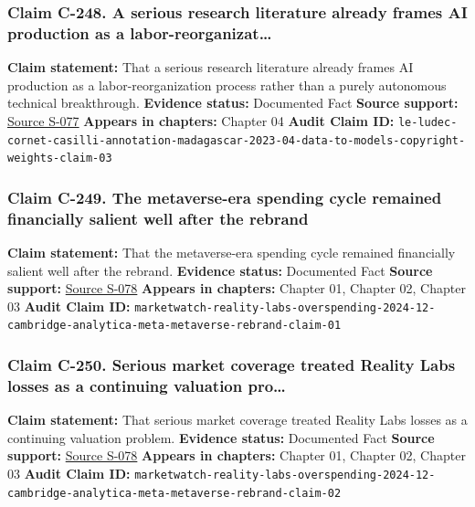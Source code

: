 \documentclass[
  american,
  11pt,
  letterpaper,
]{article}
\begin{document}
\subsubsection{Claim C-248. A serious research literature already frames
AI production as a
labor-reorganizat\ldots{}}\label{claim-c-248-a-serious-research-literature-already-frames-ai-production-as-a-labor-reorganizat}

\textbf{Claim statement:} That a serious research literature already
frames AI production as a labor-reorganization process rather than a
purely autonomous technical breakthrough. \textbf{Evidence status:}
Documented Fact \textbf{Source support:}
\hyperref[source-s-077-the-problem-with-annotation-human-labour-and-outsourcing-between-france-and-madagascar]{Source
S-077} \textbf{Appears in chapters:} Chapter 04 \textbf{Audit Claim ID:}
\texttt{le-ludec-cornet-casilli-annotation-madagascar-2023-04-data-to-models-copyright-weights-claim-03}

\subsubsection{Claim C-249. The metaverse-era spending cycle remained
financially salient well after the
rebrand}\label{claim-c-249-the-metaverse-era-spending-cycle-remained-financially-salient-well-after-the-rebrand}

\textbf{Claim statement:} That the metaverse-era spending cycle remained
financially salient well after the rebrand. \textbf{Evidence status:}
Documented Fact \textbf{Source support:}
\hyperref[source-s-078-with-reality-labs-meta-risks-heading-down-slippery-slope-of-overspending-again]{Source
S-078} \textbf{Appears in chapters:} Chapter 01, Chapter 02, Chapter 03
\textbf{Audit Claim ID:}
\texttt{marketwatch-reality-labs-overspending-2024-12-cambridge-analytica-meta-metaverse-rebrand-claim-01}

\subsubsection{Claim C-250. Serious market coverage treated Reality Labs
losses as a continuing valuation
pro\ldots{}}\label{claim-c-250-serious-market-coverage-treated-reality-labs-losses-as-a-continuing-valuation-pro}

\textbf{Claim statement:} That serious market coverage treated Reality
Labs losses as a continuing valuation problem. \textbf{Evidence status:}
Documented Fact \textbf{Source support:}
\hyperref[source-s-078-with-reality-labs-meta-risks-heading-down-slippery-slope-of-overspending-again]{Source
S-078} \textbf{Appears in chapters:} Chapter 01, Chapter 02, Chapter 03
\textbf{Audit Claim ID:}
\texttt{marketwatch-reality-labs-overspending-2024-12-cambridge-analytica-meta-metaverse-rebrand-claim-02}
\end{document}
